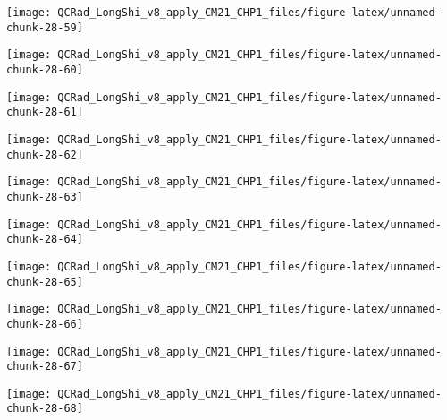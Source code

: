 \documentclass[
  10pt,
  a4paper,oneside]{article}
\begin{document}
\begin{center}\texttt{[image: QCRad\_LongShi\_v8\_apply\_CM21\_CHP1\_files/figure-latex/unnamed-chunk-28-59]} \end{center}

\begin{center}\texttt{[image: QCRad\_LongShi\_v8\_apply\_CM21\_CHP1\_files/figure-latex/unnamed-chunk-28-60]} \end{center}

\begin{center}\texttt{[image: QCRad\_LongShi\_v8\_apply\_CM21\_CHP1\_files/figure-latex/unnamed-chunk-28-61]} \end{center}

\begin{center}\texttt{[image: QCRad\_LongShi\_v8\_apply\_CM21\_CHP1\_files/figure-latex/unnamed-chunk-28-62]} \end{center}

\begin{center}\texttt{[image: QCRad\_LongShi\_v8\_apply\_CM21\_CHP1\_files/figure-latex/unnamed-chunk-28-63]} \end{center}

\begin{center}\texttt{[image: QCRad\_LongShi\_v8\_apply\_CM21\_CHP1\_files/figure-latex/unnamed-chunk-28-64]} \end{center}

\begin{center}\texttt{[image: QCRad\_LongShi\_v8\_apply\_CM21\_CHP1\_files/figure-latex/unnamed-chunk-28-65]} \end{center}

\begin{center}\texttt{[image: QCRad\_LongShi\_v8\_apply\_CM21\_CHP1\_files/figure-latex/unnamed-chunk-28-66]} \end{center}

\begin{center}\texttt{[image: QCRad\_LongShi\_v8\_apply\_CM21\_CHP1\_files/figure-latex/unnamed-chunk-28-67]} \end{center}

\begin{center}\texttt{[image: QCRad\_LongShi\_v8\_apply\_CM21\_CHP1\_files/figure-latex/unnamed-chunk-28-68]} \end{center}
\end{document}
